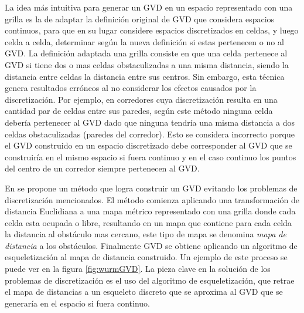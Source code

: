 La idea más intuitiva para generar un GVD en un espacio representado con una grilla es la de adaptar la definición original de GVD que considera espacios continuos, para que en su lugar considere espacios discretizados en celdas, y luego celda a celda, determinar según la nueva definición si estas pertenecen o no al GVD. La definición adaptada una grilla consiste en que una celda pertenece al GVD si tiene dos o mas celdas obstaculizadas a una misma distancia, siendo la distancia entre celdas la distancia entre sus centros. Sin embargo, esta técnica genera resultados erróneos al no considerar los efectos causados por la discretización. Por ejemplo, en corredores cuya discretización resulta en una cantidad par de celdas entre sus paredes, según este método ninguna celda debería pertenecer al GVD dado que ninguna  tendría una misma distancia a dos celdas obstaculizadas (paredes del corredor). Esto se considera incorrecto porque el GVD construido en un espacio discretizado debe corresponder al GVD que se construiría en el mismo espacio si fuera continuo y  en el caso continuo los puntos del centro de un corredor siempre pertenecen al GVD. %

En \cite{wurm2008coordinated} se propone un método que logra construir un GVD evitando los problemas de discretización mencionados. El método comienza aplicando una transformación de distancia Euclidiana \cite{meijster2002general} a una mapa métrico representado con una grilla donde cada celda esta ocupada o libre, resultando en un mapa que contiene para cada celda la distancia al obstáculo mas cercano, este tipo de mapa se denomina \emph{mapa de distancia} a los obstáculos. Finalmente GVD se obtiene aplicando un algoritmo de esqueletización \cite{wan2008distance} al mapa de distancia construido. Un ejemplo de este proceso se puede ver en la figura \ref{fig:wurmGVD}. La pieza clave en la solución de los problemas de discretización es el uso del algoritmo de esqueletización, que retrae el mapa de distancias a un esqueleto discreto que se aproxima al GVD que se generaría en el espacio si fuera continuo.   

